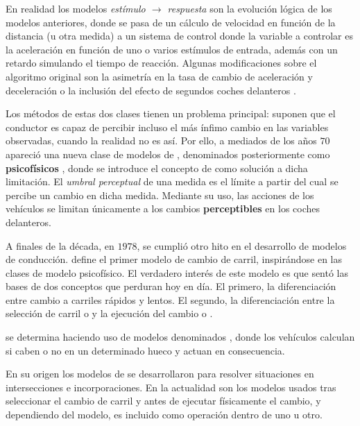 En realidad los modelos \textit{estímulo $\rightarrow$ respuesta} son la evolución lógica de los modelos anteriores, donde se pasa de un cálculo de velocidad en función de la distancia (u otra medida) a un sistema de control donde la variable a controlar es la aceleración en función de uno o varios estímulos de entrada, además con un retardo simulando el tiempo de reacción. Algunas modificaciones sobre el algoritmo original son la asimetría en la tasa de cambio de aceleración y deceleración \cite{Gazis1959} o la inclusión del efecto de segundos coches delanteros \cite{Bexelius1968}.

Los métodos de estas dos clases tienen un problema principal: suponen que el conductor es capaz de percibir incluso el más ínfimo cambio en las variables observadas, cuando la realidad no es así. Por ello, a mediados de los años $70$ apareció una nueva clase de modelos de \textit{}, denominados posteriormente como \textbf{psicofísicos} \cite{wiedemann1974simulation}, donde se introduce el concepto de \textit{} como solución a dicha limitación. El \textit{umbral perceptual} de una medida es el límite a partir del cual se percibe un cambio en dicha medida. Mediante su uso, las acciones de los vehículos se limitan únicamente a los cambios \textbf{perceptibles} en los coches delanteros.

A finales de la década, en $1978$, se cumplió otro hito en el desarrollo de modelos de conducción. \cite{Sparmann1978} define el primer modelo de cambio de carril, inspirándose en las clases de modelo psicofísico. El verdadero interés de este modelo es que sentó las bases de dos conceptos que perduran hoy en día. El primero, la diferenciación entre cambio a carriles rápidos y lentos. El segundo, la diferenciación entre la selección de carril o \textit{} y la ejecución del cambio o \textit{}.

 se determina haciendo uso de modelos denominados \textit{}, donde los vehículos calculan si caben o no en un determinado hueco y actuan en consecuencia.

En su origen los modelos de \textit{} se desarrollaron para resolver situaciones en intersecciones e incorporaciones. En la actualidad son los modelos usados tras seleccionar el cambio de carril y antes de ejecutar físicamente el cambio, y dependiendo del modelo, es incluido como operación dentro de uno u otro.

